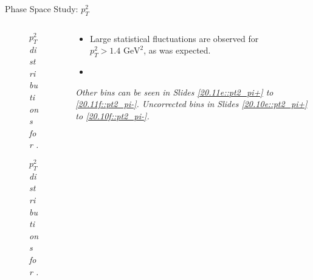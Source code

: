 \begin{frame}{Phase Space Study: $p_T^2$}
    \label{12.15::pt2}

    \begin{columns}[onlytextwidth,T]

    \begin{column}{.44\linewidth}
        \vspace{-15pt}
        \begin{center}
            \begin{figure}[t]
                \scriptsize{\textit{$p_T^2$ distributions for \ef{$\pi^-$}.}}
            \end{figure}

            \vspace{-15pt}
            \begin{figure}[t]
                \scriptsize{\textit{$p_T^2$ distributions for \ef{$\pi^+$}.}}
            \end{figure}
        \end{center}
    \end{column}

    \begin{column}{.54\linewidth}
        \begin{itemize}
            \item
                Large statistical fluctuations are observed for $p_T^2 > 1.4 \text{ GeV}^2$, as was expected.

            \vspace{12pt}
            \item
        \end{itemize}

        \vspace{114pt}

        \begin{flushright}
            \tiny{\textit{
                Other bins can be seen in Slides \textcolor{efd_purple}{\ref{20.11e::pt2_pi+}} to \textcolor{efd_purple}{\ref{20.11f::pt2_pi-}}.
                Uncorrected bins in Slides \textcolor{efd_purple}{\ref{20.10e::pt2_pi+}} to \textcolor{efd_purple}{\ref{20.10f::pt2_pi-}}.
            }}
        \end{flushright}
    \end{column}

    \end{columns}
\end{frame}

